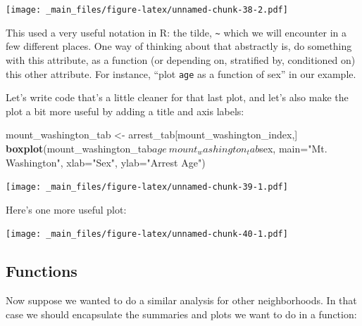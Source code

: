 \documentclass[]{article}
\newenvironment{Shaded}{\begin{snugshade}}{\end{snugshade}}
\newcommand{\KeywordTok}[1]{\textcolor[rgb]{0.13,0.29,0.53}{\textbf{{#1}}}}
\newcommand{\DataTypeTok}[1]{\textcolor[rgb]{0.13,0.29,0.53}{{#1}}}
\newcommand{\StringTok}[1]{\textcolor[rgb]{0.31,0.60,0.02}{{#1}}}
\newcommand{\NormalTok}[1]{{#1}}
\theoremstyle{definition}
\theoremstyle{definition}
\theoremstyle{remark}
\begin{document}
\texttt{[image: \_main\_files/figure-latex/unnamed-chunk-38-2.pdf]}

This used a very useful notation in R: the tilde,
\texttt{\textasciitilde{}} which we will encounter in a few different
places. One way of thinking about that abstractly is, do something with
this attribute, as a function (or depending on, stratified by,
conditioned on) this other attribute. For instance, ``plot \texttt{age}
as a function of sex'' in our example.

Let's write code that's a little cleaner for that last plot, and let's
also make the plot a bit more useful by adding a title and axis labels:

\begin{Shaded}
\begin{Highlighting}[]
\NormalTok{mount_washington_tab <-}\StringTok{ }\NormalTok{arrest_tab[mount_washington_index,]}
\KeywordTok{boxplot}\NormalTok{(mount_washington_tab$age~mount_washington_tab$sex,}
        \DataTypeTok{main=}\StringTok{"Mt. Washington"}\NormalTok{, }
        \DataTypeTok{xlab=}\StringTok{"Sex"}\NormalTok{, }\DataTypeTok{ylab=}\StringTok{"Arrest Age"}\NormalTok{)}
\end{Highlighting}
\end{Shaded}

\texttt{[image: \_main\_files/figure-latex/unnamed-chunk-39-1.pdf]}

Here's one more useful plot:

\begin{Shaded}
\end{Shaded}

\texttt{[image: \_main\_files/figure-latex/unnamed-chunk-40-1.pdf]}

\subsection{Functions}\label{functions}

Now suppose we wanted to do a similar analysis for other neighborhoods.
In that case we should encapsulate the summaries and plots we want to do
in a function:
\end{document}
